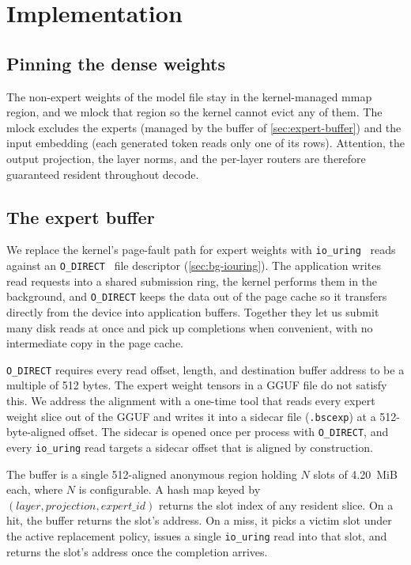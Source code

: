 \chapter{Implementation}\label{chapter:implementation}

\section{Pinning the dense weights}\label{sec:pinning}

The non-expert weights of the model file stay in the kernel-managed mmap region, and we mlock that region so the kernel cannot evict any of them.
The mlock excludes the experts (managed by the buffer of \autoref{sec:expert-buffer}) and the input embedding (each generated token reads only one of its rows).
Attention, the output projection, the layer norms, and the per-layer routers are therefore guaranteed resident throughout decode.


\section{The expert buffer}\label{sec:expert-buffer}

We replace the kernel's page-fault path for expert weights with \texttt{io\_uring}~\cite{axboe2019iouring} reads against an \texttt{O\_DIRECT}~\cite{open_man} file descriptor (\autoref{sec:bg-iouring}).
The application writes read requests into a shared submission ring, the kernel performs them in the background, and \texttt{O\_DIRECT} keeps the data out of the page cache so it transfers directly from the device into application buffers.
Together they let us submit many disk reads at once and pick up completions when convenient, with no intermediate copy in the page cache.

\texttt{O\_DIRECT} requires every read offset, length, and destination buffer address to be a multiple of 512 bytes.
The expert weight tensors in a GGUF file do not satisfy this.
We address the alignment with a one-time tool that reads every expert weight slice out of the GGUF and writes it into a sidecar file (\texttt{.bscexp}) at a 512-byte-aligned offset.
The sidecar is opened once per process with \texttt{O\_DIRECT}, and every \texttt{io\_uring} read targets a sidecar offset that is aligned by construction.

The buffer is a single 512-aligned anonymous region holding $N$ slots of 4.20~MiB each, where $N$ is configurable.
A hash map keyed by $(\mathit{layer}, \mathit{projection}, \mathit{expert\_id})$ returns the slot index of any resident slice.
On a hit, the buffer returns the slot's address.
On a miss, it picks a victim slot under the active replacement policy, issues a single \texttt{io\_uring} read into that slot, and returns the slot's address once the completion arrives.

